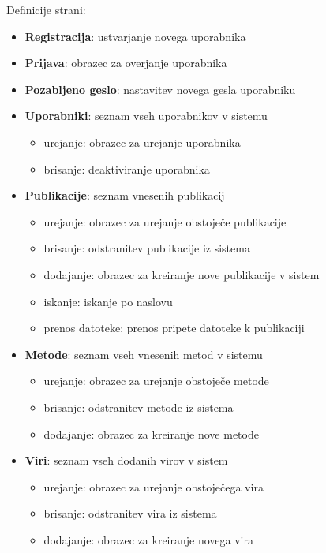 \documentclass[a4paper, 12pt]{book}
\begin{document}
\begin{description}
\item Definicije strani: \
	\begin{itemize}
        \item \textbf{Registracija}: ustvarjanje novega uporabnika
		\item \textbf{Prijava}: obrazec za overjanje uporabnika
		\item \textbf{Pozabljeno geslo}: nastavitev novega gesla uporabniku
		\item \textbf{Uporabniki}: seznam vseh uporabnikov v sistemu
		\begin{itemize}
		    \item urejanje: obrazec za urejanje uporabnika
		    \item brisanje: deaktiviranje uporabnika
		\end{itemize}
		\item \textbf{Publikacije}: seznam vnesenih publikacij
		\begin{itemize}
		    \item urejanje: obrazec za urejanje obstoječe publikacije
		    \item brisanje: odstranitev publikacije iz sistema
		    \item dodajanje: obrazec za kreiranje nove publikacije v sistem
		    \item iskanje: iskanje po naslovu 
		    \item prenos datoteke: prenos pripete datoteke k publikaciji
		\end{itemize}
		\item \textbf{Metode}: seznam vseh vnesenih metod v sistemu
		\begin{itemize}
		    \item urejanje: obrazec za urejanje obstoječe metode
		    \item brisanje: odstranitev metode iz sistema
		    \item dodajanje: obrazec za kreiranje nove metode
		\end{itemize}
		
		\item \textbf{Viri}: seznam vseh dodanih virov v sistem
		\begin{itemize}
		    \item urejanje: obrazec za urejanje obstoječega vira
		    \item brisanje: odstranitev vira iz sistema
		    \item dodajanje: obrazec za kreiranje novega vira
		\end{itemize}
		

\end{itemize}
\end{description}
\end{document}
